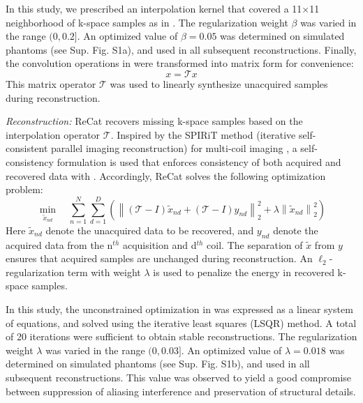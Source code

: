 \documentclass[11pt, onecolumn]{article}
\begin{document}
In this study, we prescribed an interpolation kernel that covered a 11$\times$11 neighborhood of k-space samples as in \cite{Ilicak:FJpKoYYb}. The regularization weight $\beta$ was varied in the range $(0, 0.2]$. An optimized value of $\beta=0.05$ was determined on simulated phantoms (see Sup. Fig. S1a), and used in all subsequent reconstructions. Finally, the convolution operations in  were transformed into matrix form for convenience:
\begin{equation}
\label{eq:interp2}
{x}=\mathcal{T} {x} 
\end{equation}
This matrix operator $\mathcal{T}$ was used to linearly synthesize unacquired samples during reconstruction. 

\textit{Reconstruction:} ReCat recovers missing k-space samples based on the interpolation operator $\mathcal{T}$. Inspired by the SPIRiT method (iterative self-consistent parallel imaging reconstruction) for multi-coil imaging \cite{Lustig:2010hs}, a self-consistency formulation is used that enforces consistency of both acquired and recovered data with . Accordingly, ReCat solves the following optimization problem:
\begin{equation}
\label{eq:recat_opt}
\mathop {\min }\limits_{{{\tilde x}_{nd}}} \quad \sum\limits_{n=1}^N {\sum\limits_{d=1}^D {\left( {\left\| {(\mathcal{T} - I){{\tilde x}_{nd}} + (\mathcal{T} - I){y_{nd}}} \right\|_2^2 + \lambda \left\| {{{\tilde x}_{nd}}} \right\|_2^2} \right)} }
\end{equation}
Here ${\tilde x _{nd}}$ denote the unacquired data to be recovered, and $y_{nd}$ denote the acquired data from the n$^{th}$ acquisition and d$^{th}$ coil. The separation of ${\tilde x}$ from $y$ ensures that acquired samples are unchanged during reconstruction. An ${\ell}_2$-regularization term with weight $\lambda$ is used to penalize the energy in recovered k-space samples. 

In this study, the unconstrained optimization in  was expressed as a linear system of equations, and solved using the iterative least squares (LSQR) method. A total of 20 iterations were sufficient to obtain stable reconstructions. The regularization weight $\lambda$ was varied in the range $(0, 0.03]$. An optimized value of $\lambda=0.018$ was determined on simulated phantoms (see Sup. Fig. S1b), and used in all subsequent reconstructions. This value was observed to yield a good compromise between suppression of aliasing interference and preservation of structural details.
\end{document}
